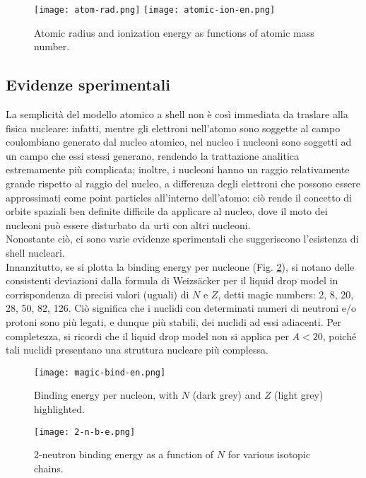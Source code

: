 \begin{figure}[!t]
	\centering
	\texttt{[image: atom-rad.png]}
	\texttt{[image: atomic-ion-en.png]}
	\caption{Atomic radius and ionization energy as functions of atomic mass number.}
	\label{atom-prop}
\end{figure}

\subsection{Evidenze sperimentali}

La semplicità del modello atomico a shell non è così immediata da traslare alla fisica nucleare: infatti, mentre gli elettroni nell'atomo sono soggette al campo coulombiano generato dal nucleo atomico, nel nucleo i nucleoni sono soggetti ad un campo che essi stessi generano, rendendo la trattazione analitica estremamente più complicata; inoltre, i nucleoni hanno un raggio relativamente grande rispetto al raggio del nucleo, a differenza degli elettroni che possono essere approssimati come point particles all'interno dell'atomo: ciò rende il concetto di orbite spaziali ben definite difficile da applicare al nucleo, dove il moto dei nucleoni può essere disturbato da urti con altri nucleoni.\\
Nonostante ciò, ci sono varie evidenze sperimentali che suggeriscono l'esistenza di shell nucleari.\\
Innanzitutto, se si plotta la binding energy per nucleone (Fig. \ref{magic-bind-en}), si notano delle consistenti deviazioni dalla formula di Weizsäcker per il liquid drop model in corrispondenza di precisi valori (uguali) di $ N $ e $ Z $, detti magic numbers: 2, 8, 20, 28, 50, 82, 126. Ciò significa che i nuclidi con determinati numeri di neutroni e/o protoni sono più legati, e dunque più stabili, dei nuclidi ad essi adiacenti. Per completezza, si ricordi che il liquid drop model non si applica per $ A < 20 $, poiché tali nuclidi presentano una struttura nucleare più complessa.

\begin{figure}[!t]
	\centering
	\texttt{[image: magic-bind-en.png]}
	\caption{Binding energy per nucleon, with $ N $ (dark grey) and $ Z $ (light grey) highlighted.}
	\label{magic-bind-en}
\end{figure}

\begin{figure}[!ht]
	\centering
	\texttt{[image: 2-n-b-e.png]}
	\caption{2-neutron binding energy as a function of $ N $ for various isotopic chains.}
	\label{2-n-b-e}
\end{figure}

